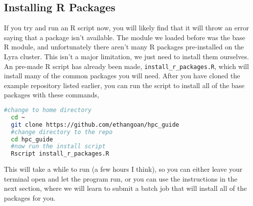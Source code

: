 \subsection{Installing R Packages}
If you try and run an R script now, you will likely find that it will throw an error saying that a package isn't available. The module we loaded before was the base R module, and unfortunately there aren't many R packages pre-installed on the Lyra cluster. This isn't a major limitation, we just need to install them ourselves. An pre-made R script has already been made, \texttt{install\_r\_packages.R}, which will install many of the common packages you will need. After you have cloned the example repository listed earlier, you can run the script to install all of the base packages with these commands,
\begin{lstlisting}[language=bash, frame=single]
  #change to home directory
  cd ~
  git clone https://github.com/ethangoan/hpc_guide  
  #change directory to the repo
  cd hpc_guide
  #now run the install script
  Rscript install_r_packages.R
\end{lstlisting}
%
%
This will take a while to run (a few hours I think), so you can either leave your terminal open and let the program run, or you can use the instructions in the next section, where we will learn to submit a batch job that will install all of the packages for you.
%
%
